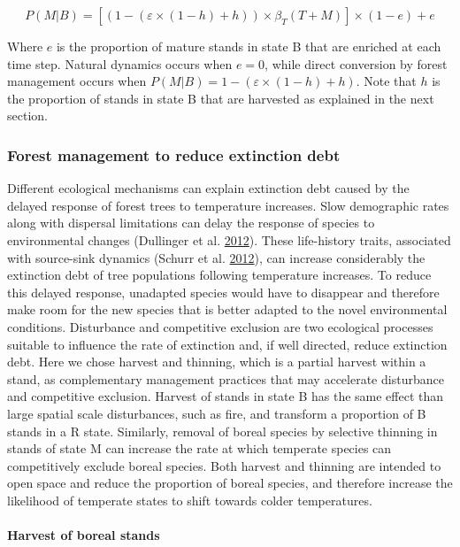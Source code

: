 \documentclass[12pt]{article}
\begin{document}
\[
P(M|B) = [(1- (\varepsilon \times (1 - h) + h)) \times \beta_T(T + M)] \times (1-e) + e
\]

Where \(e\) is the proportion of mature stands in state B that are
enriched at each time step. Natural dynamics occurs when \(e=0\), while
direct conversion by forest management occurs when
\(P(M|B)= 1- (\varepsilon \times (1 - h) + h)\). Note that \(h\) is the
proportion of stands in state B that are harvested as explained in the
next section.

\hypertarget{forest-management-to-reduce-extinction-debt}{%
\subsubsection{Forest management to reduce extinction
debt}\label{forest-management-to-reduce-extinction-debt}}

Different ecological mechanisms can explain extinction debt caused by
the delayed response of forest trees to temperature increases. Slow
demographic rates along with dispersal limitations can delay the
response of species to environmental changes (Dullinger et al.
\protect\hyperlink{ref-Dullinger2012}{2012}). These life-history traits,
associated with source-sink dynamics (Schurr et al.
\protect\hyperlink{ref-Schurr2012}{2012}), can increase considerably the
extinction debt of tree populations following temperature increases. To
reduce this delayed response, unadapted species would have to disappear
and therefore make room for the new species that is better adapted to
the novel environmental conditions. Disturbance and competitive
exclusion are two ecological processes suitable to influence the rate of
extinction and, if well directed, reduce extinction debt. Here we chose
harvest and thinning, which is a partial harvest within a stand, as
complementary management practices that may accelerate disturbance and
competitive exclusion. Harvest of stands in state B has the same effect
than large spatial scale disturbances, such as fire, and transform a
proportion of B stands in a R state. Similarly, removal of boreal
species by selective thinning in stands of state M can increase the rate
at which temperate species can competitively exclude boreal species.
Both harvest and thinning are intended to open space and reduce the
proportion of boreal species, and therefore increase the likelihood of
temperate states to shift towards colder temperatures.

\hypertarget{harvest-of-boreal-stands}{%
\paragraph{Harvest of boreal stands}\label{harvest-of-boreal-stands}}
\end{document}
